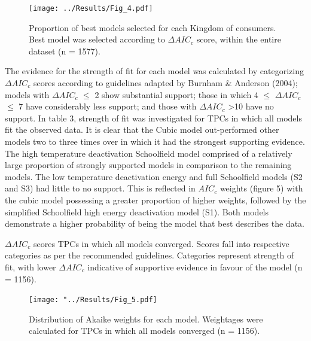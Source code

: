 \documentclass[12pt]{article}
\begin{document}
\begin{linenumbers}
\begin{figure}[H]	\texttt{[image: ../Results/Fig\_4.pdf]}
	\centering
	\caption{Proportion of  best models selected for each Kingdom of consumers. Best model was selected according to \(\Delta AIC_c\) score, within the entire dataset (n = 1577).}
\end{figure}


The evidence for the strength of fit for each model was calculated by categorizing \(\Delta AIC_c\) scores according to guidelines adapted by Burnham \& Anderson (2004); models with \(\Delta AIC_c\) $\leq$ 2 show substantial support; those in which 4 $\leq$ \(\Delta AIC_c\) $\leq$ 7 have considerably less support; and those with \(\Delta AIC_c\) \textgreater 10 have no support. In table 3, strength of fit was investigated for TPCs in which all models fit the observed data. It is clear that the Cubic model out-performed other models two to three times over in which it had the strongest supporting evidence. The high temperature deactivation Schoolfield model comprised of a relatively large proportion of strongly supported models in comparison to the remaining models. The low temperature deactivation energy and full Schoolfield models (S2 and S3) had little to no support. This is reflected in \(AIC_c\) weights (figure 5) with the cubic model possessing a greater proportion of higher weights, followed by the simplified Schoolfield high energy deactivation model (S1). Both models demonstrate a higher probability of being the model that best describes the data.

\vspace{0.7cm}
\begin{table}[H]
	\FloatBarrier
	\caption{\(\Delta AIC_c\) scores TPCs in which all models converged.  Scores fall into respective categories as per the recommended guidelines. Categories represent strength of fit, with lower \(\Delta AIC_c\) indicative of supportive evidence in favour of the model (n = 1156).}
\begin{adjustbox}{height = 2.7cm, width=15cm}
		\centering
	
	\FloatBarrier
\end{adjustbox}
\end{table}




\begin{figure}[H]
	\texttt{[image: "../Results/Fig\_5.pdf]}
	\centering
	\caption{Distribution of Akaike weights for each model. Weightages were calculated for TPCs in which all models converged (n = 1156).}
\end{figure}


\end{linenumbers}
\end{document}
